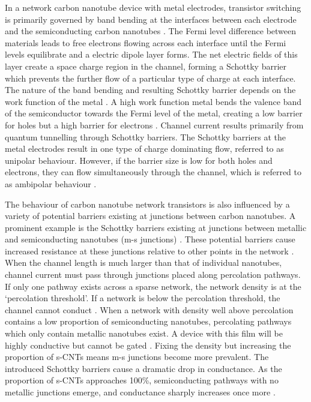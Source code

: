 \documentclass[
  a4paper,
]{scrbook}
\begin{document}
In a network carbon nanotube device with metal electrodes, transistor
switching is primarily governed by band bending at the interfaces
between each electrode and the semiconducting carbon nanotubes
\autocite{Avouris2007,Bargaoui2018}. The Fermi level difference between
materials leads to free electrons flowing across each interface until
the Fermi levels equilibrate and a electric dipole layer forms. The net
electric fields of this layer create a space charge region in the
channel, forming a Schottky barrier which prevents the further flow of a
particular type of charge at each interface. The nature of the band
bending and resulting Schottky barrier depends on the work function of
the metal \autocite{Cowley1999,Zhang2012}. A high work function metal
bends the valence band of the semiconductor towards the Fermi level of
the metal, creating a low barrier for holes but a high barrier for
electrons \autocite{Avouris2007,Zhang2012,Bargaoui2018}. Channel current
results primarily from quantum tunnelling through Schottky barriers. The
Schottky barriers at the metal electrodes result in one type of charge
dominating flow, referred to as unipolar behaviour. However, if the
barrier size is low for both holes and electrons, they can flow
simultaneously through the channel, which is referred to as ambipolar
behaviour \autocite{Avouris2007,Heller2008}.

The behaviour of carbon nanotube network transistors is also influenced
by a variety of potential barriers existing at junctions between carbon
nanotubes. A prominent example is the Schottky barriers existing at
junctions between metallic and semiconducting nanotubes (m-s junctions)
\autocite{Fuhrer2000,Topinka2009,Murugathas2019a}. These potential
barriers cause increased resistance at these junctions relative to other
points in the network \autocite{Fuhrer2000,Jang2015}. When the channel
length is much larger than that of individual nanotubes, channel current
must pass through junctions placed along percolation pathways. If only
one pathway exists across a sparse network, the network density is at
the `percolation threshold'. If a network is below the percolation
threshold, the channel cannot conduct
\autocite{Hu2004,Topinka2009,Jang2015}. When a network with density well
above percolation contains a low proportion of semiconducting nanotubes,
percolating pathways which only contain metallic nanotubes exist. A
device with this film will be highly conductive but cannot be gated
\autocite{Fuhrer2000,Topinka2009}. Fixing the density but increasing the
proportion of s-CNTs means m-s junctions become more prevalent. The
introduced Schottky barriers cause a dramatic drop in conductance. As
the proportion of s-CNTs approaches 100\%, semiconducting pathways with
no metallic junctions emerge, and conductance sharply increases once
more \autocite{Topinka2009}.
\end{document}
